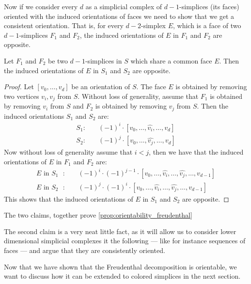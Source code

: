 Now if we consider every $d$ as a simplicial complex of $d-1$-simplices (its faces) oriented with the induced orientations of faces we need to show that we get a consistent orientation. That is, for every $d-2$-simplex $E$, which is a face of two $d-1$-simplices $F_1$ and $F_2$, the induced orientations of $E$ in $F_1$ and $F_2$ are opposite.

\begin{claim}\label{claim:orientability_inside_simplex}
	Let $F_1$ and $F_2$ be two $d-1$-simplices in $S$ which share a common face $E$. Then the induced orientations of $E$ in $S_1$ and $S_2$ are opposite.
\end{claim}
\begin{proof}
	Let $[v_0, \dots, v_{d}]$ be an orientation of $S$. The face $E$ is obtained by removing two vertices $v_i, v_j$ from $S$. Without loss of generality, assume that $F_1$ is obtained by removing $v_i$ from $S$ and $F_2$ is obtained by removing $v_j$ from $S$. Then the induced orientations $S_1$ and $S_2$ are:
	\begin{align*}
		S_1: \quad & {(-1)}^i \cdot [v_0, \dots, \hat{v_i}, \dots, v_{d}] \\
		S_2: \quad & {(-1)}^j \cdot [v_0, \dots, \hat{v_j}, \dots, v_{d}]
	\end{align*}
	Now without loss of generality assume that $i < j$, then we have that the induced orientations of $E$ in $F_1$ and $F_2$ are:
	\begin{align*}
		\text{$E$ in $S_1$ }: \quad & {(-1)}^i \cdot {(-1)}^{j-1} \cdot [v_0, \dots, \hat{v_i}, \dots, \hat{v_j}, \dots, v_{d-1}] \\
		\text{$E$ in $S_2$ }: \quad & {(-1)}^j \cdot {(-1)}^i \cdot [v_0, \dots, \hat{v_i}, \dots, \hat{v_j}, \dots, v_{d-1}]
	\end{align*}
	This shows that the induced orientations of $E$ in $S_1$ and $S_2$ are opposite.
\end{proof}

The two claims, together prove \cref{prop:orientability_freudenthal}

The second claim is a very neat little fact, as it will allow us to consider lower dimensional simplicial complexes it the following --- like for instance sequences of faces --- and argue that they are consistently oriented.

Now that we have shown that the Freudenthal decomposition is orientable, we want to discuss how it can be extended to colored simplices in the next section.


